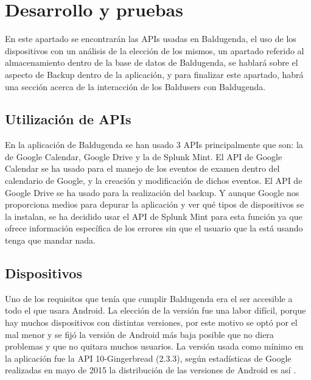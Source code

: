 \section{Desarrollo y pruebas}
\label{secc:desarrollo y pruebas}
En este apartado se encontrarán las APIs usadas en Baldugenda, el uso de los dispositivos con un análisis de la elección de los mismos, un apartado referido al almacenamiento dentro de la base de datos de Baldugenda, se hablará sobre el aspecto de Backup dentro de la aplicación, y para finalizar este apartado, habrá una sección acerca de la interacción de los Baldusers con Baldugenda.
\subsection{Utilización de APIs}
\label{subsecc:Utilización de APIs}

En la aplicación de Baldugenda se han usado 3 APIs principalmente que son: la de Google Calendar, Google Drive y la de Splunk Mint.
El API de Google Calendar se ha usado para el manejo de los eventos de examen dentro del calendario de Google, y la creación y modificación de dichos eventos.
El API de Google Drive se ha usado para la realización del backup.
Y aunque Google nos proporciona medios para depurar la aplicación y ver qué tipos de dispositivos se la instalan, se ha decidido usar el API de Splunk Mint para esta función ya que ofrece información específica de los errores sin que el usuario que la está usando tenga que mandar nada.

\subsection{Dispositivos}
\label{subsecc:Dispositivos}

Uno de los requisitos que tenía que cumplir Baldugenda era el ser accesible a todo el que usara Android. La elección de la versión fue una labor difícil, porque hay muchos dispositivos con distintas versiones, por este motivo se optó por el mal menor y se fijó la versión de Android más baja posible que no diera problemas y que no quitara muchos usuarios.
La versión usada como mínimo en la aplicación fue la API 10-Gingerbread (2.3.3), según estadísticas de Google realizadas en mayo de 2015 la distribución de las versiones de Android es así \cite{dashboards}.


